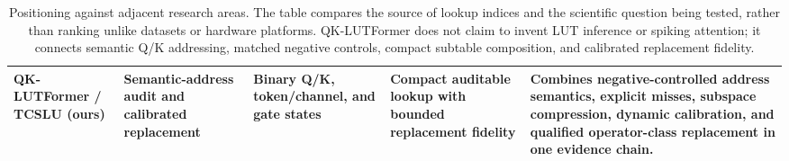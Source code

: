 \begin{table}[t]
{\begin{tabular}{p{}p{}p{}p{}p{}}
\textbf{QK-LUTFormer / TCSLU (ours)} &
\textbf{Semantic-address audit and calibrated replacement} &
\textbf{Binary Q/K, token/channel, and gate states} &
\textbf{Compact auditable lookup with bounded replacement fidelity} &
\textbf{Combines negative-controlled address semantics, explicit misses,
subspace compression, dynamic calibration, and qualified operator-class
replacement in one evidence chain.} \\
\bottomrule
\end{tabular}
}
\caption{Positioning against adjacent research areas. The table compares the
source of lookup indices and the scientific question being tested, rather than
ranking unlike datasets or hardware platforms. QK-LUTFormer does not claim to
invent LUT inference or spiking attention; it connects semantic Q/K addressing,
matched negative controls, compact subtable composition, and calibrated
replacement fidelity.}
\label{tab:related-work-positioning}
\end{table}
